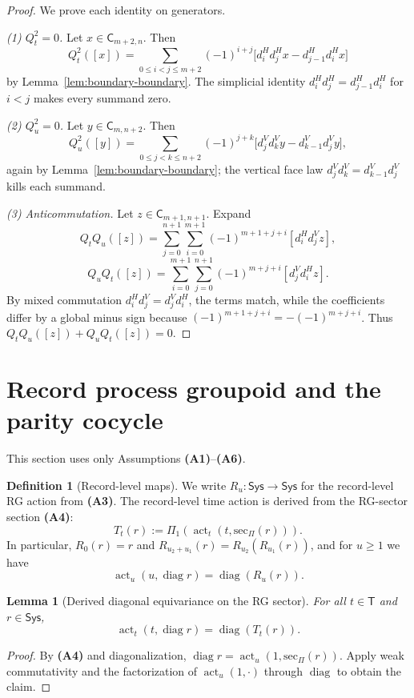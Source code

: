 \documentclass[aps,prl,reprint]{revtex4-2}
\newcommand{\Sys}{\mathsf{Sys}}
\newcommand{\Time}{\mathsf{T}}
\newcommand{\CSK}{\mathsf{C}}
\newcommand{\diag}{\operatorname{diag}}
\newcommand{\actT}{\operatorname{act}_t}
\newcommand{\actU}{\operatorname{act}_u}
\theoremstyle{definition}
\newtheorem{definition}{Definition}[section]
\theoremstyle{plain}
\newtheorem{lemma}{Lemma}[section]
\begin{document}
\begin{proof}
We prove each identity on generators.

\smallskip\noindent
\emph{(1) $Q_t^2=0$.}
Let $x\in\CSK_{m+2,n}$. Then
\[
Q_t^2([x])
=\sum_{0\le i<j\le m+2}(-1)^{i+j}\big[d^H_i d^H_j x - d^H_{j-1} d^H_i x\big]
\]
by Lemma~\ref{lem:boundary-boundary}. The simplicial identity
$d^H_i d^H_j = d^H_{j-1} d^H_i$ for $i<j$ makes every summand zero.

\smallskip\noindent
\emph{(2) $Q_u^2=0$.}
Let $y\in\CSK_{m,n+2}$. Then
\[
Q_u^2([y])
=\sum_{0\le j<k\le n+2}(-1)^{j+k}\big[d^V_j d^V_k y - d^V_{k-1} d^V_j y\big],
\]
again by Lemma~\ref{lem:boundary-boundary}; the vertical face law
$d^V_j d^V_k=d^V_{k-1}d^V_j$ kills each summand.

\smallskip\noindent
\emph{(3) Anticommutation.}
Let $z\in\CSK_{m+1,n+1}$. Expand
\[Q_tQ_u([z])=\sum_{j=0}^{n+1}\sum_{i=0}^{m+1}(-1)^{m+1+j+i}[d^H_i d^V_j z],\]
\[Q_uQ_t([z])=\sum_{i=0}^{m+1}\sum_{j=0}^{n+1}(-1)^{m+j+i}[d^V_j d^H_i z].\]
By mixed commutation $d^H_i d^V_j=d^V_j d^H_i$, the terms match, while the
coefficients differ by a global minus sign because $(-1)^{m+1+j+i}=-(-1)^{m+j+i}$.
Thus $Q_tQ_u([z])+Q_uQ_t([z])=0$.
\end{proof}

\section{Record process groupoid and the parity cocycle}
\label{sec:groupoid}
This section uses only Assumptions \textbf{(A1)}--\textbf{(A6)}.

\begin{definition}[Record-level maps]
\label{def:record-level-actions}
We write $R_u:\Sys\to\Sys$ for the record-level RG action from \textbf{(A3)}.
The record-level time action is derived from the RG-sector section \textbf{(A4)}:
\[
T_t(r):=\Pi_{1}(\actT(t,\mathrm{sec}_\Pi(r))).
\]
In particular, $R_0(r)=r$ and $R_{u_2+u_1}(r)=R_{u_2}(R_{u_1}(r))$, and for $u\ge 1$ we have
\[
\actU(u,\diag r)=\diag(R_u(r)).
\]

\end{definition}

\begin{lemma}[Derived diagonal equivariance on the RG sector]
\label{lem:derived-diag-equiv}
For all $t\in\Time$ and $r\in\Sys$,
\[
\actT(t,\diag r)=\diag(T_t(r)).
\]
\end{lemma}

\begin{proof}
By \textbf{(A4)} and diagonalization, $\diag r=\actU(1,\mathrm{sec}_\Pi(r))$.
Apply weak commutativity and the factorization of $\actU(1,\cdot)$ through $\diag$
to obtain the claim.
\end{proof}
\end{document}
